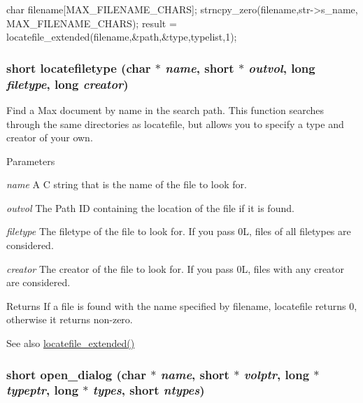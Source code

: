\begin{DoxyCode}
    char filename[MAX_FILENAME_CHARS]; 
    strncpy_zero(filename,str->s_name, MAX_FILENAME_CHARS); 
    result = locatefile_extended(filename,&path,&type,typelist,1); 
\end{DoxyCode}
 \hypertarget{group__files_ga8f43f2c9eb53933bbf354997eebb495d}{
\subsubsection[{locatefiletype}]{\setlength{\rightskip}{0pt plus 5cm}short locatefiletype (char $\ast$ {\em name}, \/  short $\ast$ {\em outvol}, \/  long {\em filetype}, \/  long {\em creator})}}
\label{group__files_ga8f43f2c9eb53933bbf354997eebb495d}


Find a Max document by name in the search path. This function searches through the same directories as locatefile, but allows you to specify a type and creator of your own.


\begin{DoxyParams}{Parameters}
\item[{\em name}]A C string that is the name of the file to look for. \item[{\em outvol}]The Path ID containing the location of the file if it is found. \item[{\em filetype}]The filetype of the file to look for. If you pass 0L, files of all filetypes are considered. \item[{\em creator}]The creator of the file to look for. If you pass 0L, files with any creator are considered.\end{DoxyParams}
\begin{DoxyReturn}{Returns}
If a file is found with the name specified by filename, locatefile returns 0, otherwise it returns non-\/zero.
\end{DoxyReturn}
\begin{DoxySeeAlso}{See also}
\hyperlink{group__files_gaa2899b66e1457da0ee333f9407230ccd}{locatefile\_\-extended()} 
\end{DoxySeeAlso}
\hypertarget{group__files_ga0d8fd0b13e2e623298a45e846af3fe1a}{
\subsubsection[{open\_\-dialog}]{\setlength{\rightskip}{0pt plus 5cm}short open\_\-dialog (char $\ast$ {\em name}, \/  short $\ast$ {\em volptr}, \/  long $\ast$ {\em typeptr}, \/  long $\ast$ {\em types}, \/  short {\em ntypes})}}
\label{group__files_ga0d8fd0b13e2e623298a45e846af3fe1a}


